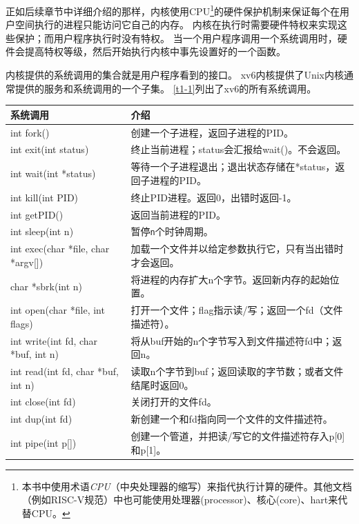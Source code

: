 正如后续章节中详细介绍的那样，内核使用CPU\footnote{本书中使用术语\emph{CPU}（中央处理器的缩写）来指代执行计算的硬件。其他文档（例如RISC-V规范）中也可能使用处理器(processor)、核心(core)、hart来代替CPU。}的硬件保护机制来保证每个在用户空间执行的进程只能访问它自己的内存。
内核在执行时需要硬件特权来实现这些保护；而用户程序执行时没有特权。
当一个用户程序调用一个系统调用时，硬件会提高特权等级，然后开始执行内核中事先设置好的一个函数。

内核提供的系统调用的集合就是用户程序看到的接口。
xv6内核提供了Unix内核通常提供的服务和系统调用的一个子集。
\autoref{t1-1}列出了xv6的所有系统调用。

\begin{table}[htbp]
    \centering
    \begin{tabular}{ll}
        \textbf{系统调用}   & \textbf{介绍} \\
        \hline
        int fork()  & 创建一个子进程，返回子进程的PID。\\
        int exit(int status)    & 终止当前进程；status会汇报给wait()。不会返回。\\
        int wait(int *status)   & 等待一个子进程退出；退出状态存储在*status，返回子进程的PID。 \\
        int kill(int PID)   & 终止PID进程。返回0，出错时返回-1。\\
        int getPID()    & 返回当前进程的PID。         \\
        int sleep(int n)    & 暂停\texttt{n}个时钟周期。  \\
        int exec(char *file, char *argv[])  & 加载一个文件并以给定参数执行它，只有当出错时才会返回。  \\
        char *sbrk(int n) & 将进程的内存扩大n个字节。返回新内存的起始位置。   \\
        int open(char *file, int flags) & 打开一个文件；flag指示读/写；返回一个fd（文件描述符）。 \\
        int write(int fd, char *buf, int n)   & 将从buf开始的n个字节写入到文件描述符fd中；返回n。 \\
        int read(int fd, char *buf, int n)    & 读取n个字节到buf；返回读取的字节数；或者文件结尾时返回0。 \\
        int close(int fd)   & 关闭打开的文件fd。  \\
        int dup(int fd)     & 新创建一个和fd指向同一个文件的文件描述符。    \\
        int pipe(int p[])     & 创建一个管道，并把读/写它的文件描述符存入p[0]和p[1]。 \\

\end{tabular}
\end{table}
